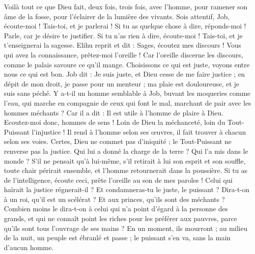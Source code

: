 \begin{multicols}{2}
Voilà tout ce que Dieu fait, deux fois, trois fois, avec l'homme,
pour ramener son âme de la fosse, pour l'éclairer de la lumière des vivants.
Sois attentif, Job, écoute-moi ! Tais-toi, et je parlerai !
Si tu as quelque chose à dire, réponds-moi ! Parle, car je désire te justifier.
Si tu n'as rien à dire, écoute-moi ! Tais-toi, et je t'enseignerai la sagesse.
\VerseOne{}Elihu reprit et dit :
Sages, écoutez mes discours ! Vous qui avez la connaissance, prêtez-moi l'oreille !
Car l'oreille discerne les discours, comme le palais savoure ce qu'il mange.
Choisissons ce qui est juste, voyons entre nous ce qui est bon.
Job dit : Je suis juste, et Dieu cesse de me faire justice ;
en dépit de mon droit, je passe pour un menteur ; ma plaie est douloureuse, et je suis sans péché.
Y a-t-il un homme semblable à Job, buvant les moqueries comme l'eau,
qui marche en compagnie de ceux qui font le mal, marchant de pair avec les hommes méchants ?
Car il a dit : Il est utile à l'homme de plaire à Dieu.
Ecoutez-moi donc, hommes de sens ! Loin de Dieu la méchanceté, loin du Tout-Puissant l'injustice !
Il rend à l'homme selon ses œuvres, il fait trouver à chacun selon ses voies.
Certes, Dieu ne commet pas d'iniquité ; le Tout-Puissant ne renverse pas la justice.
Qui lui a donné la charge de la terre ? Qui l'a mis dans le monde ?
S'il ne pensait qu'à lui-même, s'il retirait à lui son esprit et son souffle,
toute chair périrait ensemble, et l'homme retournerait dans la poussière.
Si tu as de l'intelligence, écoute ceci, prête l'oreille au son de mes paroles !
Celui qui haïrait la justice régnerait-il ? Et condamneras-tu le juste, le puissant ?
Dira-t-on à un roi, qu'il est un scélérat ? Et aux princes, qu'ils sont des méchants ?
Combien moins le dira-t-on à celui qui n'a point d'égard à la personne des grands, et qui ne connaît point les riches pour les préférer aux pauvres, parce qu'ils sont tous l'ouvrage de ses mains ?
En un moment, ils mourront ; au milieu de la nuit, un peuple est ébranlé et passe ; le puissant s'en va, sans la main d'aucun homme.

\end{multicols}
